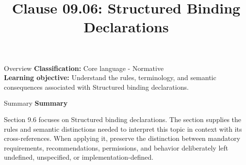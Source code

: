 \documentclass[10pt,letterpaper]{article}
\title{Clause 09.06: Structured Binding Declarations}
\author{}
\date{}
\begin{document}
\maketitle
\begin{CornellOverviewBox}{Overview}
\textbf{Classification:} Core language - Normative\\[2pt]
\textbf{Learning objective:} Understand the rules, terminology, and semantic consequences associated with Structured binding declarations.
\end{CornellOverviewBox}\begin{CornellSummaryBox}{Summary}
{\sffamily\bfseries\color{Accent} Summary}\par\vspace{3pt}Section 9.6 focuses on Structured binding declarations. The section supplies the rules and semantic distinctions needed to interpret this topic in context with its cross-references. When applying it, preserve the distinction between mandatory requirements, recommendations, permissions, and behavior deliberately left undefined, unspecified, or implementation-defined.
\end{CornellSummaryBox}
\end{document}
